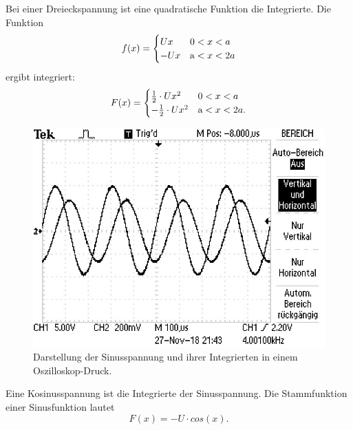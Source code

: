 \noindent Bei einer Dreieckspannung ist eine quadratische Funktion die Integrierte.
Die Funktion
\begin{equation*}
  f(x) =
  \begin{cases}
    Ux & \text 0 < x < a \\
    -Ux & \text a < x < 2a \\
  \end{cases}
\end{equation*}
ergibt integriert:
\begin{equation*}
  F(x) =
  \begin{cases}
    \frac{1}{2} \cdot Ux^2 & \text 0 < x < a \\
    -\frac{1}{2} \cdot Ux^2 & \text a < x < 2a .\\
  \end{cases}
\end{equation*}
\begin{figure}[H]
  \centering
  \includegraphics{Sinus.JPG}
  \caption{Darstellung der Sinusspannung und ihrer Integrierten in einem Oszilloskop-Druck.}
  \label{fig:plot}
\end{figure}
\noindent Eine Kosinusspannung ist die Integrierte der Sinusspannung.
Die Stammfunktion einer Sinusfunktion lautet
\begin{equation*}
  F(x) = -U \cdot cos(x) .
\end{equation*}




